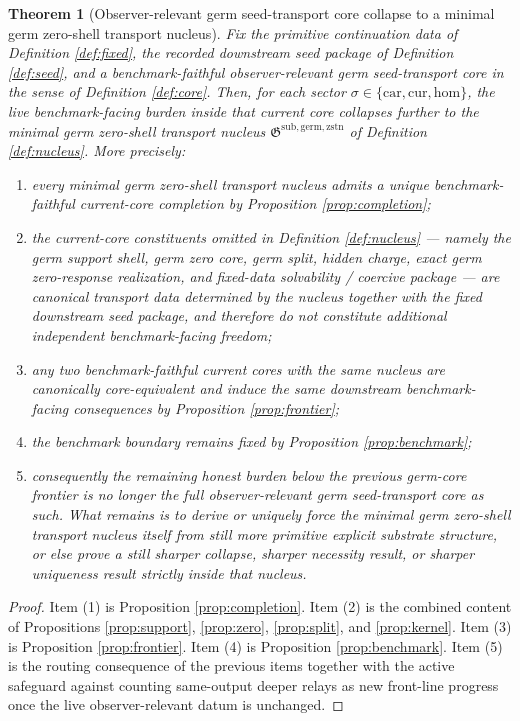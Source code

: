 \documentclass[11pt]{article}
\newcommand{\Car}{\mathrm{car}}
\newcommand{\Cur}{\mathrm{cur}}
\newcommand{\Hom}{\mathrm{hom}}
\newcommand{\GermNucleus}{\mathfrak G^{\mathrm{sub,germ,zstn}}}
\newtheorem{theorem}{Theorem}
\begin{document}
\begin{theorem}[Observer-relevant germ seed-transport core collapse to a minimal germ zero-shell transport nucleus]
\label{thm:main}
Fix the primitive continuation data of Definition \ref{def:fixed}, the recorded downstream seed package of Definition \ref{def:seed}, and a benchmark-faithful observer-relevant germ seed-transport core in the sense of Definition \ref{def:core}. Then, for each sector \(\sigma\in\{\Car,\Cur,\Hom\}\), the live benchmark-facing burden inside that current core collapses further to the minimal germ zero-shell transport nucleus \(\GermNucleus\) of Definition \ref{def:nucleus}. More precisely:
\begin{enumerate}
    \item every minimal germ zero-shell transport nucleus admits a unique benchmark-faithful current-core completion by Proposition \ref{prop:completion};
    \item the current-core constituents omitted in Definition \ref{def:nucleus} --- namely the germ support shell, germ zero core, germ split, hidden charge, exact germ zero-response realization, and fixed-data solvability / coercive package --- are canonical transport data determined by the nucleus together with the fixed downstream seed package, and therefore do not constitute additional independent benchmark-facing freedom;
    \item any two benchmark-faithful current cores with the same nucleus are canonically core-equivalent and induce the same downstream benchmark-facing consequences by Proposition \ref{prop:frontier};
    \item the benchmark boundary remains fixed by Proposition \ref{prop:benchmark};
    \item consequently the remaining honest burden below the previous germ-core frontier is no longer the full observer-relevant germ seed-transport core as such. What remains is to derive or uniquely force the minimal germ zero-shell transport nucleus itself from still more primitive explicit substrate structure, or else prove a still sharper collapse, sharper necessity result, or sharper uniqueness result strictly inside that nucleus.
\end{enumerate}
\end{theorem}

\begin{proof}
Item (1) is Proposition \ref{prop:completion}. Item (2) is the combined content of Propositions \ref{prop:support}, \ref{prop:zero}, \ref{prop:split}, and \ref{prop:kernel}. Item (3) is Proposition \ref{prop:frontier}. Item (4) is Proposition \ref{prop:benchmark}. Item (5) is the routing consequence of the previous items together with the active safeguard against counting same-output deeper relays as new front-line progress once the live observer-relevant datum is unchanged.
\end{proof}
\end{document}
